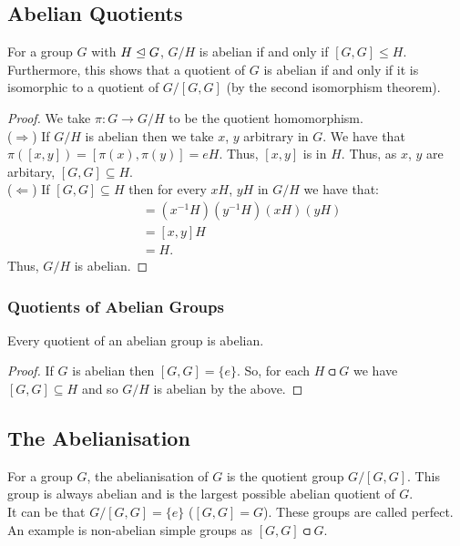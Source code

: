 \subsection{Abelian Quotients} \label{2.28}

For a group $G$ with $H \trianglelefteq G$, $G/H$ is abelian if and only if 
$[G, G] \leq H$. Furthermore, this shows that a quotient of $G$
is abelian if and only if it is isomorphic to a quotient of $G/[G, G]$
(by the second isomorphism theorem).

\begin{proof}
    We take $\pi : G \to G/H$ to be the quotient homomorphism.
    \\[\baselineskip]
    ($\Rightarrow$) 
    If $G/H$ is abelian then we take $x$, $y$ arbitrary in $G$. 
    We have that $\pi([x, y]) = [\pi(x), \pi(y)] = eH$. 
    Thus, $[x, y]$ is in $H$. 
    Thus, as $x$, $y$ are arbitary, $[G, G] \subseteq H$.
    \\[\baselineskip]
    ($\Leftarrow$)
    If $[G, G] \subseteq H$ then for every $xH$, $yH$ in $G/H$ we have
    that: \begin{align*}
        [xH, yH] &= (x^{-1}H)(y^{-1}H)(xH)(yH) \\
        &= [x, y]H \\
        &= H.
    \end{align*} Thus, $G/H$ is abelian.
\end{proof}

\subsubsection{Quotients of Abelian Groups}

Every quotient of an abelian group is abelian.

\begin{proof}
    If $G$ is abelian then $[G, G] = \{e\}$. So, for each $H \csub G$
    we have $[G, G] \subseteq H$ and so $G/H$ is abelian by the above.
\end{proof}

\subsection{The Abelianisation}

For a group $G$, the abelianisation of $G$ is the quotient group 
$G/[G, G]$. This group is always abelian and is the largest possible
abelian quotient of $G$.
\\[\baselineskip]
It can be that $G/[G, G] = \{e\}$ ($[G, G] = G$). These groups are
called perfect. An example is non-abelian simple groups as $[G, G] \csub G$.
